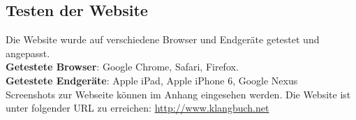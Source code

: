 \subsection{Testen der Website}
Die Website wurde auf verschiedene Browser und Endgeräte getestet und angepasst.\\
\textbf{Getestete Browser}: Google Chrome, Safari, Firefox.\\
\textbf{Getestete Endgeräte}: Apple iPad, Apple iPhone 6, Google Nexus\\


Screenshots zur Webseite können im Anhang eingesehen werden.
Die Website ist unter folgender URL zu erreichen: \url{http://www.klangbuch.net}








